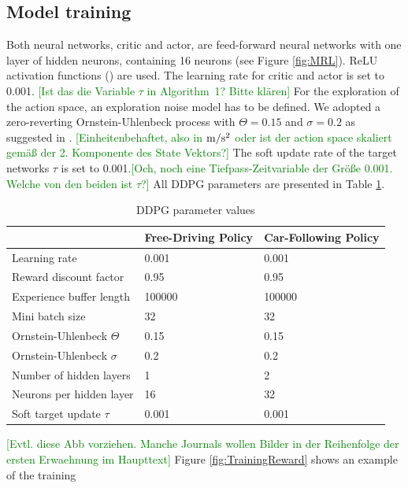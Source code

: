 \documentclass[review]{elsarticle}
\providecommand{\green}[1]{\textcolor{green}{#1}}
\providecommand{\martinc}[1]{\green{[#1]}} %
\providecommand{\3}{{\ss}}
\begin{document}
\subsection{Model training}
Both neural networks, critic and actor, are feed-forward neural
networks with one layer of hidden neurons, containing 16 neurons (see
Figure \ref{fig:MRL}). ReLU activation functions (\cite{relu}) are used. The learning rate for
critic and actor is set to 0.001. \martinc{Ist das die Variable $\tau$
  in Algorithm~1? Bitte kl\"aren} For the exploration of the action
space, an exploration noise model has to be defined. We adopted a
zero-reverting Ornstein-Uhlenbeck process with $\Theta = 0.15$  and
$\sigma = 0.2$ as suggested in
\cite{DDPG}. \martinc{Einheitenbehaftet, also in $\unit[]{m/s^2}$ oder
  ist der action space skaliert gem\"a\3 der 2. Komponente des State
  Vektors?} The soft update rate of the target networks $\tau$ is set to
0.001.\martinc{Och, noch eine Tiefpass-Zeitvariable der Gr\"o\3e
  0.001. Welche von den beiden ist $\tau$?}
All DDPG parameters are presented in Table \ref{tab:DDPGparameters}.
%
  \begin{table}
	\caption{DDPG parameter values} 
	\label{tab:DDPGparameters} 
	\begin{center}
		\begin{tabular}{ p{} p{}  p{} }
			 & Free-Driving Policy & Car-Following Policy \\ \hline
			Learning rate & 0.001 & 0.001\\ 
			Reward discount factor & 0.95 & 0.95 \\ 
			Experience buffer length & 100000 & 100000 \\ 
			Mini batch size & 32 & 32 \\ 			
			Ornstein-Uhlenbeck  $\Theta$ & 0.15& 0.15 \\ 
			Ornstein-Uhlenbeck  $\sigma$ & 0.2 & 0.2 \\ 
			Number of hidden layers & 1 & 2\\
			Neurons per hidden layer & 16 & 32\\
			Soft target update  $\tau$ & 0.001 & 0.001\\
			
			
		\end{tabular}
	\end{center}
\end{table}
%
\martinc{Evtl. diese Abb vorziehen. Manche Journals wollen Bilder in
  der Reihenfolge der ersten Erwaehnung im Haupttext}
Figure \ref{fig:TrainingReward} shows an example of the training
\end{document}
